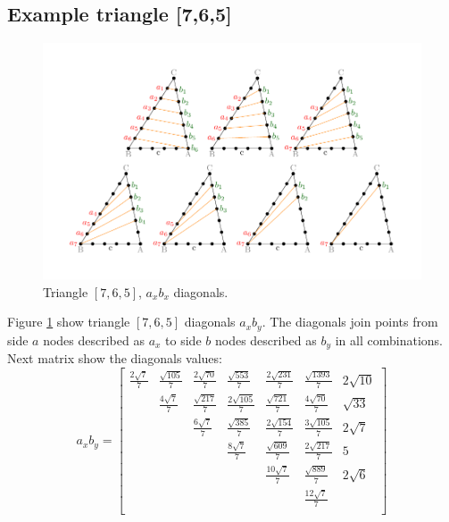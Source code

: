 \documentclass[11pt]{article}
\begin{document}
\subsection{Example triangle [7,6,5]}

\begin{figure}[htp]
\centering
\includegraphics[scale=1]{t765ab}
\caption{Triangle $[7,6,5]$, $a_xb_x$ diagonals.}
\label{t765ab}
\end{figure}

Figure \ref{t765ab} show triangle $[7,6,5]$ diagonals $a_xb_y$.
The diagonals join points from side $a$ nodes described as $a_x$ to side $b$ nodes described as $b_y$ in all combinations.
Next matrix show the diagonals values:
\[
a_xb_y = \begin{bmatrix}
	\frac{2\sqrt7}7 & \frac{\sqrt{105}}7 & \frac{2\sqrt{70}}7 & \frac{\sqrt{553}}7 & \frac{2\sqrt{231}}7 & \frac{\sqrt{1393}}7 & 2\sqrt{10} \\
	 & \frac{4\sqrt7}7 & \frac{\sqrt{217}}7 & \frac{2\sqrt{105}}7 & \frac{\sqrt{721}}7 & \frac{4\sqrt{70}}7 & \sqrt{33} \\
	 & & \frac{6\sqrt7}7 & \frac{\sqrt{385}}7 & \frac{2\sqrt{154}}7 & \frac{3\sqrt{105}}7 & 2\sqrt{7} \\
	 & & & \frac{8\sqrt7}7 & \frac{\sqrt{609}}7 & \frac{2\sqrt{217}}7 & 5 \\
	 & & & & \frac{10\sqrt7}7 & \frac{\sqrt{889}}7 & 2\sqrt{6} \\
	 & & & & & \frac{12\sqrt7}7 \\
\end{bmatrix}
\]
\end{document}
